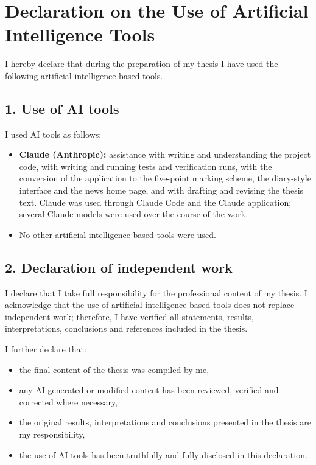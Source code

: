 \clearpage
{}
\chapter*{Declaration on the Use of Artificial Intelligence Tools}

\medskip
I hereby declare that during the preparation of my thesis I have used the following artificial intelligence-based tools.

\section*{1. Use of AI tools}

\fbox{\rule{0pt}{1.1ex}\rule{1.1ex}{0pt}}\hspace{0.3em}I used AI tools as follows:

\begin{itemize}
  \item \textbf{Claude (Anthropic):} assistance with writing and understanding the project code, with writing and running tests and verification runs, with the conversion of the application to the five-point marking scheme, the diary-style interface and the news home page, and with drafting and revising the thesis text. Claude was used through Claude Code and the Claude application; several Claude models were used over the course of the work.
  \item No other artificial intelligence-based tools were used.
\end{itemize}

\section*{2. Declaration of independent work}

I declare that I take full responsibility for the professional content of my thesis. I acknowledge that the use of artificial intelligence-based tools does not replace independent work; therefore, I have verified all statements, results, interpretations, conclusions and references included in the thesis.

I further declare that:
\begin{itemize}
  \item the final content of the thesis was compiled by me,
  \item any AI-generated or modified content has been reviewed, verified and corrected where necessary,
  \item the original results, interpretations and conclusions presented in the thesis are my responsibility,
  \item the use of AI tools has been truthfully and fully disclosed in this declaration.
\end{itemize}
